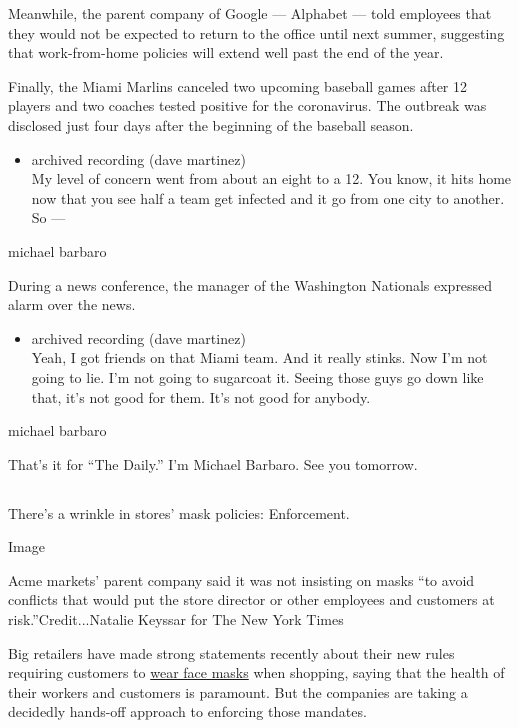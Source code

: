 Meanwhile, the parent company of Google --- Alphabet --- told employees
that they would not be expected to return to the office until next
summer, suggesting that work-from-home policies will extend well past
the end of the year.

Finally, the Miami Marlins canceled two upcoming baseball games after 12
players and two coaches tested positive for the coronavirus. The
outbreak was disclosed just four days after the beginning of the
baseball season.

\begin{itemize}
\tightlist
\item
  archived recording (dave martinez)\\
  My level of concern went from about an eight to a 12. You know, it
  hits home now that you see half a team get infected and it go from one
  city to another. So ---
\end{itemize}

michael barbaro

During a news conference, the manager of the Washington Nationals
expressed alarm over the news.

\begin{itemize}
\tightlist
\item
  archived recording (dave martinez)\\
  Yeah, I got friends on that Miami team. And it really stinks. Now I'm
  not going to lie. I'm not going to sugarcoat it. Seeing those guys go
  down like that, it's not good for them. It's not good for anybody.
\end{itemize}

michael barbaro

That's it for ``The Daily.'' I'm Michael Barbaro. See you tomorrow.

\hypertarget{-3}{%
\subsection{}\label{-3}}

There's a wrinkle in stores' mask policies: Enforcement.

Image

Acme markets' parent company said it was not insisting on masks ``to
avoid conflicts that would put the store director or other employees and
customers at risk.''Credit...Natalie Keyssar for The New York Times

Big retailers have made strong statements recently about their new rules
requiring customers to
\href{https://www.nytimes.com/article/which-stores-require-masks.html?searchResultPosition=3}{wear
face masks} when shopping, saying that the health of their workers and
customers is paramount. But the companies are taking a decidedly
hands-off approach to enforcing those mandates.

